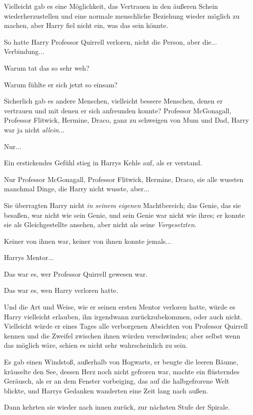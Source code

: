 {Vielleicht gab es eine Möglichkeit, das Vertrauen in den äußeren Schein wiederherzustellen und eine normale menschliche Beziehung wieder möglich zu machen, aber Harry fiel nicht ein, was das sein könnte.

So hatte Harry Professor Quirrell verloren, nicht die Person, aber die... Verbindung...

Warum tat das so sehr weh?

Warum fühlte er sich jetzt so einsam?

Sicherlich gab es andere Menschen, vielleicht bessere Menschen, denen er vertrauen und mit denen er sich anfreunden konnte? Professor McGonagall, Professor Flitwick, Hermine, Draco, ganz zu schweigen von Mum und Dad, Harry war ja nicht \emph{allein}...

Nur...

Ein erstickendes Gefühl stieg in Harrys Kehle auf, als er verstand.

Nur Professor McGonagall, Professor Flitwick, Hermine, Draco, sie alle wussten manchmal Dinge, die Harry nicht wusste, aber...

Sie überragten Harry nicht \emph{in seinem eigenen} Machtbereich; das Genie, das sie besaßen, war nicht wie sein Genie, und sein Genie war nicht wie ihres; er konnte sie als Gleichgestellte ansehen, aber nicht als seine \emph{Vorgesetzten}.

Keiner von ihnen war, keiner von ihnen konnte jemals...

Harrys Mentor...

Das war es, wer Professor Quirrell gewesen war.

Das war es, wen Harry verloren hatte.

Und die Art und Weise, wie er seinen ersten Mentor verloren hatte, würde es Harry vielleicht erlauben, ihn irgendwann zurückzubekommen, oder auch nicht. Vielleicht würde er eines Tages alle verborgenen Absichten von Professor Quirrell kennen und die Zweifel zwischen ihnen würden verschwinden; aber selbst wenn das möglich wäre, schien es nicht sehr wahrscheinlich zu sein.

Es gab einen Windstoß, außerhalb von Hogwarts, er beugte die leeren Bäume, kräuselte den See, dessen Herz noch nicht gefroren war, machte ein flüsterndes Geräusch, als er an dem Fenster vorbeiging, das auf die halbgefrorene Welt blickte, und Harrys Gedanken wanderten eine Zeit lang nach außen.

Dann kehrten sie wieder nach innen zurück, zur nächsten Stufe der Spirale.

}
